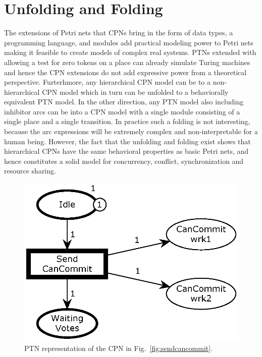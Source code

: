 \section{Unfolding and Folding}

The extensions of Petri nets that CPNs bring in the form of data
types, a programming language, and modules add practical modeling
power to Petri nets making it feasible to create models of complex
real systems. PTNs extended with  allowing a
test for zero tokens on a place can already simulate Turing machines
and hence the CPN extensions do not add expressive power from a
theoretical perspective. Furterhmore, any hierarchical CPN model can
be  to a non-hierarchical CPN model which in turn
can be unfolded to a behaviorally equivalent PTN model. In the other
direction, any PTN model also including inhibitor arcs can be
 into a CPN model with a single module consisting of a
single place and a single transition. In practice such a folding is
not interesting, because the arc expressions will be extremely complex
and non-interpretable for a human being. However, the fact that the
unfolding and folding exist shows that hierarchical CPNs have the same
behavioral properties as basic Petri nets, and hence constitutes a
solid model for concurrency, conflict, synchronization and resource
sharing.




\begin{figure}[]
\centering
\includegraphics[scale=.43]{figures/PTSendCanCommit.eps}
\caption{PTN representation of the CPN in Fig.~\ref{fig:sendcancommit}.}
\label{fig:sendcancommitunfold}
\end{figure}

